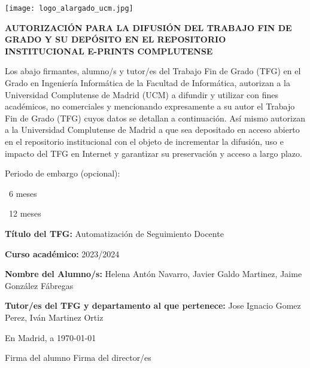 {
	\newcommand{\checkbox}{{\fboxsep=-.15pt\fbox{\rule{0pt}{1.5ex}\rule{1.5ex}{0pt}}}}
	
	\setlength{\parskip}{14pt}

	\noindent\texttt{[image: logo\_alargado\_ucm.jpg]}
	\vspace{0.5cm}
	\begin{center}
		\textbf{AUTORIZACIÓN PARA LA DIFUSIÓN DEL TRABAJO FIN DE GRADO Y SU DEPÓSITO EN EL REPOSITORIO INSTITUCIONAL E-PRINTS COMPLUTENSE}
	\end{center}
	\vspace{0.5cm}

	\noindent Los abajo firmantes, alumno/s y tutor/es del Trabajo Fin de Grado (TFG) en el Grado en 
	Ingeniería Informática de la Facultad de Informática, autorizan a la Universidad Complutense de Madrid (UCM) 
	a difundir y utilizar con fines académicos, no comerciales y mencionando expresamente 
	a su autor el Trabajo Fin de Grado (TFG) cuyos datos se detallan a continuación. 
	Así mismo autorizan a la Universidad Complutense de Madrid a que sea depositado en acceso abierto
	en el repositorio institucional con el objeto de incrementar la difusión, 
	uso e impacto del TFG en Internet y garantizar su preservación y acceso a largo plazo. 

	\noindent Periodo de embargo (opcional): 

	\quad \checkbox\ 6 meses 
	
	\quad \checkbox\ 12 meses 

	\vspace{0.5cm}

	\noindent \textbf{Título del TFG: } Automatización de Seguimiento Docente

	\noindent \textbf{Curso académico: } 2023/2024
	
	\noindent \textbf{Nombre del Alumno/s: } Helena Antón Navarro, Javier Galdo Martinez, Jaime González Fábregas
	
	\noindent \textbf{Tutor/es del TFG y departamento al que pertenece: }Jose Ignacio Gomez Perez, Iván Martinez Ortiz

	\vspace{1cm}

	\begin{center}
		En Madrid, a \today

		\vspace{1cm}

		Firma del alumno \hfill Firma del director/es
	\end{center}
}